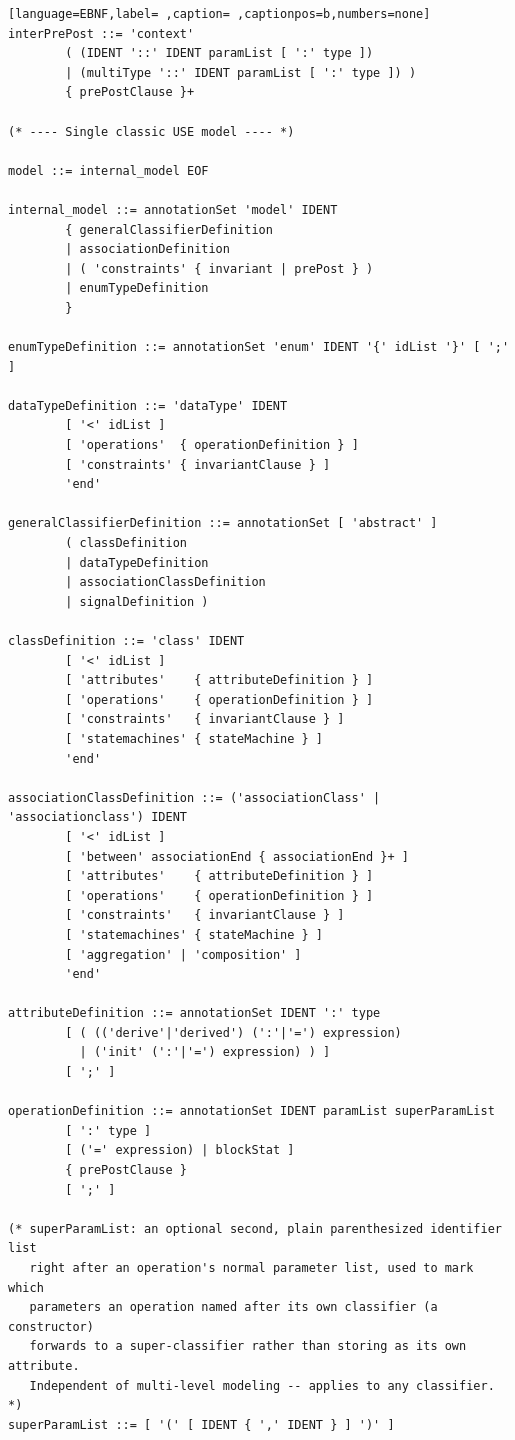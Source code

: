 \documentclass[11pt,twoside,a4paper]{book}
\begin{document}
\begin{lstlisting}[language=EBNF,label= ,caption= ,captionpos=b,numbers=none]
interPrePost ::= 'context'
        ( (IDENT '::' IDENT paramList [ ':' type ])
        | (multiType '::' IDENT paramList [ ':' type ]) )
        { prePostClause }+

(* ---- Single classic USE model ---- *)

model ::= internal_model EOF

internal_model ::= annotationSet 'model' IDENT
        { generalClassifierDefinition
        | associationDefinition
        | ( 'constraints' { invariant | prePost } )
        | enumTypeDefinition
        }

enumTypeDefinition ::= annotationSet 'enum' IDENT '{' idList '}' [ ';' ]

dataTypeDefinition ::= 'dataType' IDENT
        [ '<' idList ]
        [ 'operations'  { operationDefinition } ]
        [ 'constraints' { invariantClause } ]
        'end'

generalClassifierDefinition ::= annotationSet [ 'abstract' ]
        ( classDefinition
        | dataTypeDefinition
        | associationClassDefinition
        | signalDefinition )

classDefinition ::= 'class' IDENT
        [ '<' idList ]
        [ 'attributes'    { attributeDefinition } ]
        [ 'operations'    { operationDefinition } ]
        [ 'constraints'   { invariantClause } ]
        [ 'statemachines' { stateMachine } ]
        'end'

associationClassDefinition ::= ('associationClass' | 'associationclass') IDENT
        [ '<' idList ]
        [ 'between' associationEnd { associationEnd }+ ]
        [ 'attributes'    { attributeDefinition } ]
        [ 'operations'    { operationDefinition } ]
        [ 'constraints'   { invariantClause } ]
        [ 'statemachines' { stateMachine } ]
        [ 'aggregation' | 'composition' ]
        'end'

attributeDefinition ::= annotationSet IDENT ':' type
        [ ( (('derive'|'derived') (':'|'=') expression)
          | ('init' (':'|'=') expression) ) ]
        [ ';' ]

operationDefinition ::= annotationSet IDENT paramList superParamList
        [ ':' type ]
        [ ('=' expression) | blockStat ]
        { prePostClause }
        [ ';' ]

(* superParamList: an optional second, plain parenthesized identifier list
   right after an operation's normal parameter list, used to mark which
   parameters an operation named after its own classifier (a constructor)
   forwards to a super-classifier rather than storing as its own attribute.
   Independent of multi-level modeling -- applies to any classifier. *)
superParamList ::= [ '(' [ IDENT { ',' IDENT } ] ')' ]


\end{lstlisting}
\end{document}
